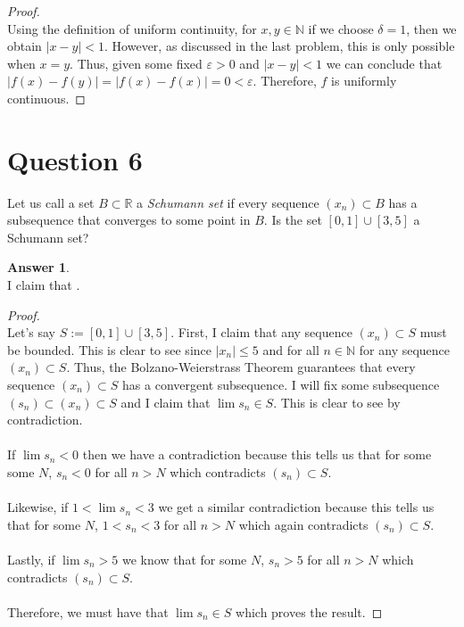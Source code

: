 \documentclass[10pt,a4paper]{article}
\theoremstyle{definition}
\newtheorem*{answer*}{Answer}
\begin{document}
\begin{proof}{$ $}
\\Using the definition of uniform continuity, for $x,y \in \mathbb{N}$ if we choose $\delta = 1$, then we obtain $|x - y| < 1$. However, as discussed in the last problem, this is only possible when $x = y$. Thus, given some fixed $\varepsilon > 0$ and $|x - y| < 1$ we can conclude that $|f(x) - f(y)| = |f(x) - f(x)| = 0 < \varepsilon$. Therefore, $f$ is uniformly continuous. 
\end{proof}

\newpage

\section*{Question 6}
Let us call a set $B \subset \mathbb{R}$ a \textit{Schumann set} if every sequence $(x_n) \subset B$ has a subsequence that converges to some point in $B$. Is the set $[0,1] \cup [3,5]$ a Schumann set?

\begin{answer*}{$ $}
\\I claim that .
\end{answer*}

\begin{proof}{$ $}
\\Let's say $S := [0,1] \cup [3,5]$. First, I claim that any sequence $(x_n) \subset S$ must be bounded. This is clear to see since $|x_n| \leq 5$ and for all $n \in \mathbb{N}$ for any sequence $(x_n) \subset S$. Thus, the Bolzano-Weierstrass Theorem guarantees that every sequence $(x_n) \subset S$ has a convergent subsequence. I will fix some subsequence $(s_n) \subset (x_n) \subset S$ and I claim that $\lim s_n \in S$. This is clear to see by contradiction. 
\\
\\If $\lim s_n < 0$ then we have a contradiction because this tells us that for some some $N$, $s_n < 0$ for all $n > N$ which contradicts $(s_n) \subset S$.
\\
\\Likewise, if $1 < \lim s_n < 3$ we get a similar contradiction because this tells us that for some $N$, $1 < s_n < 3$ for all $n > N$ which again contradicts $(s_n) \subset S$.
\\
\\Lastly, if $\lim s_n > 5$ we know that for some $N$, $ s_n > 5$ for all $n > N$ which contradicts $(s_n) \subset S$.
\\
\\Therefore, we must have that $\lim s_n \in S$ which proves the result.
\end{proof}
\end{document}
